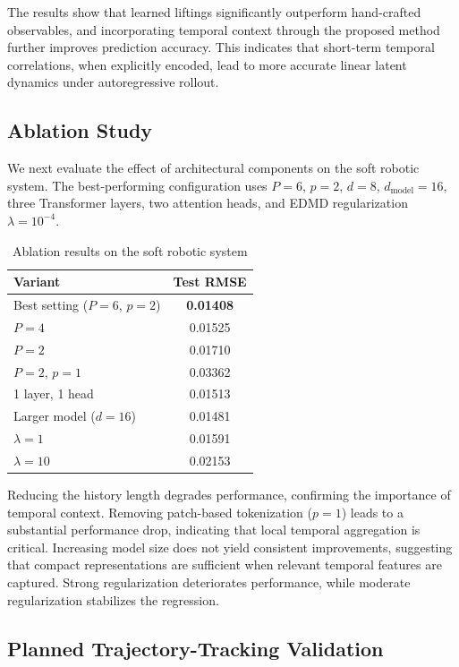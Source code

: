 \documentclass[journal]{IEEEtran}
\begin{document}
The results show that learned liftings significantly outperform hand-crafted observables, and incorporating temporal context through the proposed method further improves prediction accuracy. This indicates that short-term temporal correlations, when explicitly encoded, lead to more accurate linear latent dynamics under autoregressive rollout.

\subsection{Ablation Study}

We next evaluate the effect of architectural components on the soft robotic system. The best-performing configuration uses $P=6$, $p=2$, $d=8$, $d_{\mathrm{model}}=16$, three Transformer layers, two attention heads, and EDMD regularization $\lambda=10^{-4}$.

\begin{table}[!t]
\renewcommand{\arraystretch}{1.2}
\caption{Ablation results on the soft robotic system}
\label{tab:ablation_platform_b}
\centering
\begin{tabular}{p{}c}
\toprule
Variant & Test RMSE \\
\midrule
Best setting ($P=6$, $p=2$) & \textbf{0.01408} \\
$P=4$ & 0.01525 \\
$P=2$ & 0.01710 \\
$P=2$, $p=1$ & 0.03362 \\
1 layer, 1 head & 0.01513 \\
Larger model ($d=16$) & 0.01481 \\
$\lambda=1$ & 0.01591 \\
$\lambda=10$ & 0.02153 \\
\bottomrule
\end{tabular}
\end{table}

Reducing the history length degrades performance, confirming the importance of temporal context. Removing patch-based tokenization ($p=1$) leads to a substantial performance drop, indicating that local temporal aggregation is critical. Increasing model size does not yield consistent improvements, suggesting that compact representations are sufficient when relevant temporal features are captured. Strong regularization deteriorates performance, while moderate regularization stabilizes the regression.

\subsection{Planned Trajectory-Tracking Validation}
\end{document}
